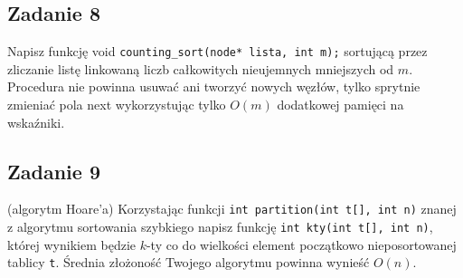 \documentclass{article}
\begin{document}
\subsection*{Zadanie 8}
Napisz funkcję void \verb+counting_sort(node* lista, int m);+ sortującą przez zliczanie
listę linkowaną liczb całkowitych nieujemnych mniejszych od $m$. Procedura nie powinna
usuwać ani tworzyć nowych węzłów, tylko sprytnie zmieniać pola next wykorzystując
tylko $O(m)$ dodatkowej pamięci na wskaźniki.

\subsection*{Zadanie 9}
(algorytm Hoare'a) Korzystając funkcji \verb+int partition(int t[], int n)+ znanej z
algorytmu sortowania szybkiego napisz funkcję \verb+int kty(int t[], int n)+, której wynikiem
będzie $k$-ty co do wielkości element początkowo nieposortowanej tablicy \verb+t+. Średnia
złożoność Twojego algorytmu powinna wynieść $O(n)$.
\end{document}
